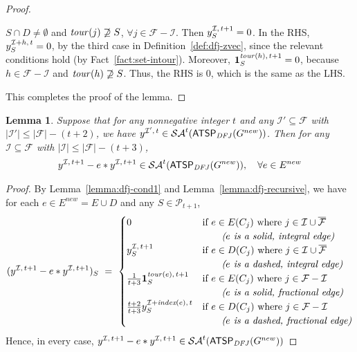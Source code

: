 \documentclass[11pt]{article}
\newtheorem{lemma}[theorem]{Lemma}
\newcommand{\pop}{\mathcal{P}}
\newcommand{\atspdfj}{\homog{\textsf{ATSP$_{\mathit{DFJ}}$}}}
\newcommand{\fracset}{\mathcal{F}}
\newcommand{\notfracset}{\overline{\mathcal{F}}}
\newcommand{\sgn}{\mathcal{I}}
\newcommand{\onevec}[2]{\textbf{1}^{#1,\,#2}}		\newcommand{\goodfrac}[2]{F^{#1}(#2)}	\newcommand{\szgoodfrac}[2]{f^{#1}(#2)}	\newcommand{\cindex}[1]{\textit{index}(#1)} \newcommand{\indfrac}{h}	\newcommand{\tour}{\textit{tour\/}}
\newcommand{\saop}{\mathcal{SA}}
\newcommand{\homog}[1]{{#1}}
\begin{document}
\begin{proof}
\begin{description}
{\item[Case~3.]
$S\cap{D}\not=\emptyset$ and
$\tour(j)\not\supseteq{S}$, $\forall j\in \fracset-\sgn$.
Then $\zvec{\sgn}{t+1}_S = 0$.
In the RHS, $\zvec{\sgn+\indfrac}{t}_S = 0$,
by the third case in Definition~\ref{def:dfj-zvec},
since the relevant conditions hold (by Fact~\ref{fact:set-intour}).
Moreover, $\onevec{\tour(\indfrac)}{t+1}_S = 0$,
because $\indfrac\in\fracset-\sgn$ and $\tour(\indfrac)\not\supseteq{S}$.
Thus, the RHS is
$0$,
which is the same as the LHS.
}\end{description}
This completes the proof of the lemma.
\end{proof}


\begin{lemma}
\label{lemma:dfj-cond2}
Suppose that for any nonnegative integer $t$ and
any $\sgn'\subseteq \fracset$ with $|\sgn'|\leq |\fracset| - (t+2)$,
we have $\zvec{\sgn'}{t} \in \saop^t(\atspdfj(G^{new}))$. Then for any $\sgn\subseteq \fracset$ with $|\sgn|\leq |\fracset| - (t+3)$,
\begin{align}
\zvec{\sgn}{t+1}-e*\zvec{\sgn}{t+1} \in \saop^t(\atspdfj(G^{new})), \quad \forall e\in E^{new} \nonumber
\end{align}
\end{lemma}
\begin{proof}By Lemma~\ref{lemma:dfj-cond1} and
Lemma~\ref{lemma:dfj-recursive}, we have for each $e\in E^{new}=E\cup{D}$ and
any $S\in\pop_{t+1}$,
\begin{align}
  ( \zvec{\sgn}{t+1} - e * \zvec{\sgn}{t+1} )_S ~=~
 \begin{cases}
  0		& \textup{if~} e\in E(C_j)
		\textup{~where~} j\in \sgn\cup\notfracset \\
		&
		\qquad \textup{\textit{($e$ is a solid, integral edge)}} \\
  \zvec{\sgn}{t+1}_S
		& \textup{if~} e\in D(C_j)
		\textup{~where~} j\in \sgn\cup\notfracset \\
		&
		\qquad \textup{\textit{($e$ is a dashed, integral edge)}} \\
  \frac{1}{t+3}\onevec{\tour(e)}{t+1}_S
		& \textup{if~} e\in E(C_j)
		\textup{~where~} j\in \fracset - \sgn \\
		&
		\qquad \textup{\textit{($e$ is a solid, fractional edge)}} \\
  \frac{t+2}{t+3}\zvec{\sgn+\cindex{e}}{t}_S
		& \textup{if~} e\in D(C_j)
		\textup{~where~} j\in \fracset - \sgn \\
		&
		\qquad \textup{\textit{($e$ is a dashed, fractional edge)}} \\
 \end{cases}
\end{align}
Hence, in every case, $\zvec{\sgn}{t+1}-e*\zvec{\sgn}{t+1} \in \saop^t(\atspdfj(G^{new}))$
\end{proof}
\end{document}
